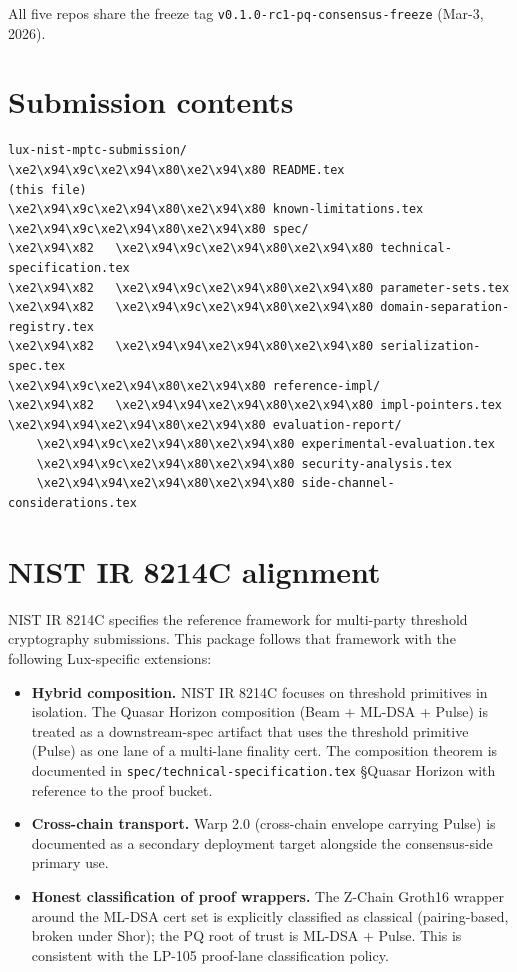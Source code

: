 \documentclass[11pt]{article}
\begin{document}
All five repos share the freeze tag \verb|v0.1.0-rc1-pq-consensus-freeze|
(Mar-3, 2026).

\section*{Submission contents}

\begin{verbatim}
lux-nist-mptc-submission/
\xe2\x94\x9c\xe2\x94\x80\xe2\x94\x80 README.tex                         (this file)
\xe2\x94\x9c\xe2\x94\x80\xe2\x94\x80 known-limitations.tex
\xe2\x94\x9c\xe2\x94\x80\xe2\x94\x80 spec/
\xe2\x94\x82   \xe2\x94\x9c\xe2\x94\x80\xe2\x94\x80 technical-specification.tex
\xe2\x94\x82   \xe2\x94\x9c\xe2\x94\x80\xe2\x94\x80 parameter-sets.tex
\xe2\x94\x82   \xe2\x94\x9c\xe2\x94\x80\xe2\x94\x80 domain-separation-registry.tex
\xe2\x94\x82   \xe2\x94\x94\xe2\x94\x80\xe2\x94\x80 serialization-spec.tex
\xe2\x94\x9c\xe2\x94\x80\xe2\x94\x80 reference-impl/
\xe2\x94\x82   \xe2\x94\x94\xe2\x94\x80\xe2\x94\x80 impl-pointers.tex
\xe2\x94\x94\xe2\x94\x80\xe2\x94\x80 evaluation-report/
    \xe2\x94\x9c\xe2\x94\x80\xe2\x94\x80 experimental-evaluation.tex
    \xe2\x94\x9c\xe2\x94\x80\xe2\x94\x80 security-analysis.tex
    \xe2\x94\x94\xe2\x94\x80\xe2\x94\x80 side-channel-considerations.tex
\end{verbatim}

\section*{NIST IR 8214C alignment}

NIST IR 8214C specifies the reference framework for multi-party threshold
cryptography submissions. This package follows that framework with the
following Lux-specific extensions:

\begin{itemize}[leftmargin=*]
\item \textbf{Hybrid composition.} NIST IR 8214C focuses on threshold
  primitives in isolation. The Quasar Horizon composition
  (Beam + ML-DSA + Pulse) is treated as a downstream-spec artifact that
  uses the threshold primitive (Pulse) as one lane of a multi-lane
  finality cert. The composition theorem is documented in
  \verb|spec/technical-specification.tex| \S Quasar Horizon with reference
  to the proof bucket.
\item \textbf{Cross-chain transport.} Warp 2.0 (cross-chain envelope
  carrying Pulse) is documented as a secondary deployment target
  alongside the consensus-side primary use.
\item \textbf{Honest classification of proof wrappers.} The Z-Chain
  Groth16 wrapper around the ML-DSA cert set is explicitly classified
  as classical (pairing-based, broken under Shor); the PQ root of trust
  is ML-DSA + Pulse. This is consistent with the LP-105 proof-lane
  classification policy.
\end{itemize}
\end{document}
